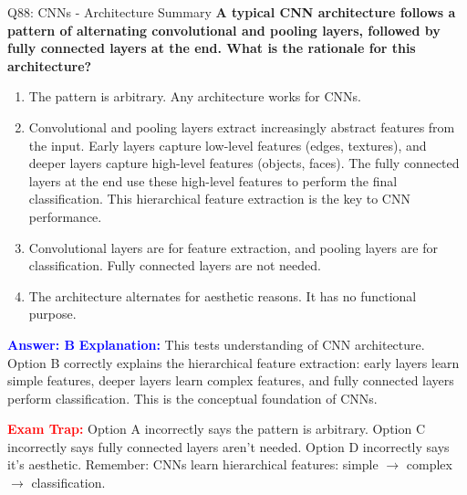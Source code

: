 \documentclass[8pt]{beamer}
\begin{document}
	\begin{frame}{Q88: CNNs - Architecture Summary}
		\fontsize{6.5}{7.5}\selectfont
		\textbf{A typical CNN architecture follows a pattern of alternating convolutional and pooling layers, followed by fully connected layers at the end. What is the rationale for this architecture?}
		
		\begin{enumerate}
			\item The pattern is arbitrary. Any architecture works for CNNs.
			\item Convolutional and pooling layers extract increasingly abstract features from the input. Early layers capture low-level features (edges, textures), and deeper layers capture high-level features (objects, faces). The fully connected layers at the end use these high-level features to perform the final classification. This hierarchical feature extraction is the key to CNN performance.
			\item Convolutional layers are for feature extraction, and pooling layers are for classification. Fully connected layers are not needed.
			\item The architecture alternates for aesthetic reasons. It has no functional purpose.
		\end{enumerate}
		
		\vspace{0.1cm}
		\textcolor{blue}{\textbf{Answer: B}}
		\vspace{0.1cm}
		\textcolor{blue}{\textbf{Explanation:}} This tests understanding of CNN architecture. Option B correctly explains the hierarchical feature extraction: early layers learn simple features, deeper layers learn complex features, and fully connected layers perform classification. This is the conceptual foundation of CNNs.
		
		\textcolor{red}{\textbf{Exam Trap:}} Option A incorrectly says the pattern is arbitrary. Option C incorrectly says fully connected layers aren't needed. Option D incorrectly says it's aesthetic. Remember: CNNs learn hierarchical features: simple $\rightarrow$ complex $\rightarrow$ classification.
	\end{frame}
	
\end{document}
